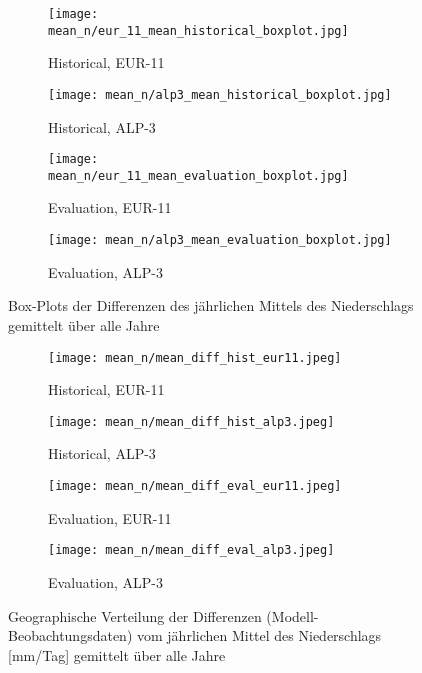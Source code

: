 \begin{figure}[h!]
	\begin{subfigure}{0.49\textwidth}
		\texttt{[image: mean\_n/eur\_11\_mean\_historical\_boxplot.jpg]}
		\caption{Historical, EUR-11}
	\end{subfigure}
	\begin{subfigure}{0.49\textwidth}
		\texttt{[image: mean\_n/alp3\_mean\_historical\_boxplot.jpg]}
		\caption{Historical, ALP-3}
	\end{subfigure}
	\begin{subfigure}{0.49\textwidth}
		\texttt{[image: mean\_n/eur\_11\_mean\_evaluation\_boxplot.jpg]}
		\caption{Evaluation, EUR-11}
	\end{subfigure}
	\begin{subfigure}{0.49\textwidth}
		\texttt{[image: mean\_n/alp3\_mean\_evaluation\_boxplot.jpg]}
		\caption{Evaluation, ALP-3}
	\end{subfigure}
	\caption{Box-Plots der Differenzen des jährlichen Mittels des Niederschlags gemittelt über alle Jahre}
	\label{fig:mean_boxplots}
\end{figure}


\begin{figure}[h!]
	\begin{subfigure}{0.49\textwidth}
		\texttt{[image: mean\_n/mean\_diff\_hist\_eur11.jpeg]}
		\caption{Historical, EUR-11}
	\end{subfigure}
	\begin{subfigure}{0.49\textwidth}
		\texttt{[image: mean\_n/mean\_diff\_hist\_alp3.jpeg]}
		\caption{Historical, ALP-3}
	\end{subfigure}
	\begin{subfigure}{0.49\textwidth}
		\texttt{[image: mean\_n/mean\_diff\_eval\_eur11.jpeg]}
		\caption{Evaluation, EUR-11}
	\end{subfigure}
	\begin{subfigure}{0.49\textwidth}
		\texttt{[image: mean\_n/mean\_diff\_eval\_alp3.jpeg]}
		\caption{Evaluation, ALP-3}
	\end{subfigure}
	\caption{Geographische Verteilung der Differenzen (Modell-Beobachtungsdaten) vom jährlichen Mittel des Niederschlags [mm/Tag] gemittelt über alle Jahre}
	\label{fig:mean_diff}
\end{figure}

